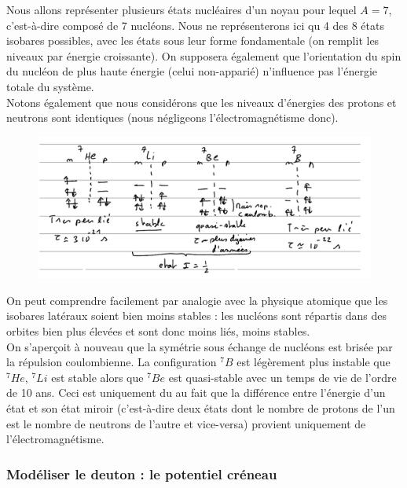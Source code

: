 Nous allons représenter plusieurs états nucléaires d'un noyau pour lequel $A=7$, c'est-à-dire composé de 7 nucléons. Nous ne représenterons ici qu 4 des 8 états isobares possibles, avec les états sous leur forme fondamentale (on remplit les niveaux par énergie croissante). On supposera également que l'orientation du spin du nucléon de plus haute énergie (celui non-apparié) n'influence pas l'énergie totale du système.\\
Notons également que nous considérons que les niveaux d'énergies des protons et neutrons sont identiques (nous négligeons l'électromagnétisme donc).\\ 
\begin{figure}[H]
    \centering
    \includegraphics[scale=0.7]{Images4/A7.PNG}
\end{figure}
On peut comprendre facilement par analogie avec la physique atomique que les isobares latéraux soient bien moins stables : les nucléons sont répartis dans des orbites bien plus élevées et sont donc moins liés, moins stables.\\
On s'aperçoit à nouveau que la symétrie sous échange de nucléons est brisée par la répulsion coulombienne. La configuration $^7B$ est légèrement plus instable que $^7He$, $^7Li$ est stable alors que $^7Be$ est quasi-stable avec un temps de vie de l'ordre de 10 ans. Ceci est uniquement du au fait que la différence entre l'énergie d'un état et son état miroir (c'est-à-dire deux états dont le nombre de protons de l'un est le nombre de neutrons de l'autre et vice-versa) provient uniquement de l'électromagnétisme.


\subsubsection{Modéliser le deuton : le potentiel créneau}


